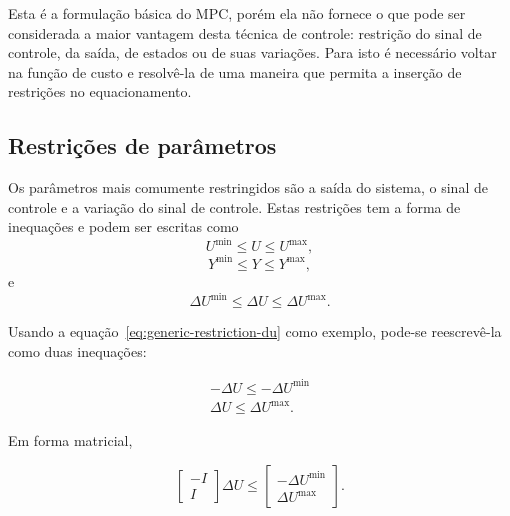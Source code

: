 Esta é a formulação básica do MPC, porém ela não fornece o que pode ser
considerada a maior vantagem desta técnica de controle: restrição do sinal de
controle, da saída, de estados ou de suas variações. Para isto é necessário
voltar na função de custo e resolvê-la de uma maneira que permita a inserção
de restrições no equacionamento.

\pagebreak

\subsection{Restrições de parâmetros}%
\label{subsec:mpc-restricted}

Os parâmetros mais comumente restringidos são a saída do sistema, o sinal de
controle e a variação do sinal de controle. Estas restrições tem a forma de
inequações e podem ser escritas como
%
\begin{equation}
	\label{eq:generic-restriction-u}
	U^{\min} \le U \le U^{\max},
\end{equation}
%
\begin{equation}
	\label{eq:generic-restriction-y}
	Y^{\min} \le Y \le Y^{\max},
\end{equation}
%
e
%
\begin{equation}
	\label{eq:generic-restriction-du}
	\Delta{}U^{\min} \le \Delta{}U \le \Delta{}U^{\max}.
\end{equation}

Usando a equação~\eqref{eq:generic-restriction-du} como exemplo, pode-se
reescrevê-la como duas inequações:

\begin{equation}
	\label{eq:generic-restriction-du-two-eq}
	\begin{split}
		-\Delta{}U \le -\Delta{}U^{\min} \\
		\Delta{}U \le \Delta{}U^{\max}.
	\end{split}
\end{equation}

Em forma matricial,

\begin{equation}
	\label{eq:generic-restriction-du-matrix-form}
	\begin{bmatrix}
		-I \\
		I
	\end{bmatrix} \Delta{}U \le
	\begin{bmatrix}
		-\Delta{}U^{\min} \\
		\Delta{}U^{\max}
	\end{bmatrix}.
\end{equation}

